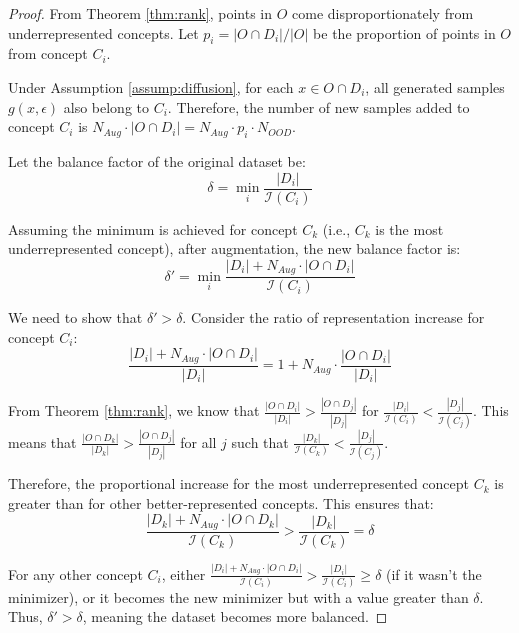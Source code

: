 \begin{proof}
\noindent
From Theorem \ref{thm:rank}, points in $O$ come disproportionately from underrepresented concepts. Let $p_i = |O \cap D_i|/|O|$ be the proportion of points in $O$ from concept $C_i$.

\noindent
Under Assumption \ref{assump:diffusion}, for each $x \in O \cap D_i$, all generated samples $g(x, \epsilon)$ also belong to $C_i$. Therefore, the number of new samples added to concept $C_i$ is $N_{Aug} \cdot |O \cap D_i| = N_{Aug} \cdot p_i \cdot N_{OOD}$.

\noindent
Let the balance factor of the original dataset be:
\begin{equation}
\delta = \min_{i} \frac{|D_i|}{\mathcal{I}(C_i)}
\end{equation}

\noindent
Assuming the minimum is achieved for concept $C_k$ (i.e., $C_k$ is the most underrepresented concept), after augmentation, the new balance factor is:
\begin{equation}
\delta' = \min_{i} \frac{|D_i| + N_{Aug} \cdot |O \cap D_i|}{\mathcal{I}(C_i)}
\end{equation}

\noindent
We need to show that $\delta' > \delta$. Consider the ratio of representation increase for concept $C_i$:
\begin{equation}
\frac{|D_i| + N_{Aug} \cdot |O \cap D_i|}{|D_i|} = 1 + N_{Aug} \cdot \frac{|O \cap D_i|}{|D_i|}
\end{equation}

\noindent
From Theorem \ref{thm:rank}, we know that $\frac{|O \cap D_i|}{|D_i|} > \frac{|O \cap D_j|}{|D_j|}$ for $\frac{|D_i|}{\mathcal{I}(C_i)} < \frac{|D_j|}{\mathcal{I}(C_j)}$. This means that $\frac{|O \cap D_k|}{|D_k|} > \frac{|O \cap D_j|}{|D_j|}$ for all $j$ such that $\frac{|D_k|}{\mathcal{I}(C_k)} < \frac{|D_j|}{\mathcal{I}(C_j)}$.

\noindent
Therefore, the proportional increase for the most underrepresented concept $C_k$ is greater than for other better-represented concepts. This ensures that:
\begin{equation}
\frac{|D_k| + N_{Aug} \cdot |O \cap D_k|}{\mathcal{I}(C_k)} > \frac{|D_k|}{\mathcal{I}(C_k)} = \delta
\end{equation}

\noindent
For any other concept $C_i$, either $\frac{|D_i| + N_{Aug} \cdot |O \cap D_i|}{\mathcal{I}(C_i)} > \frac{|D_i|}{\mathcal{I}(C_i)} \geq \delta$ (if it wasn't the minimizer), or it becomes the new minimizer but with a value greater than $\delta$. Thus, $\delta' > \delta$, meaning the dataset becomes more balanced.
\end{proof}

